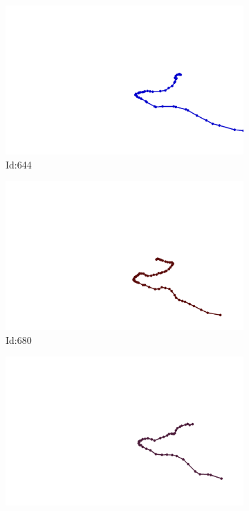 \documentclass[12pt,twoside]{report}
\begin{document}
\begin{figure}
\begin{subfigure}[b]{0.20\textwidth}
\centering
\includegraphics[width=\textwidth]{../trajectories/644.png}
\caption{Id:644}
\end{subfigure}
\begin{subfigure}[b]{0.20\textwidth}
\centering
\includegraphics[width=\textwidth]{../trajectories/680.png}
\caption{Id:680}
\end{subfigure}
\begin{subfigure}[b]{0.20\textwidth}
\centering
\includegraphics[width=\textwidth]{../trajectories/704.png}

\end{subfigure}
\end{figure}
\end{document}
